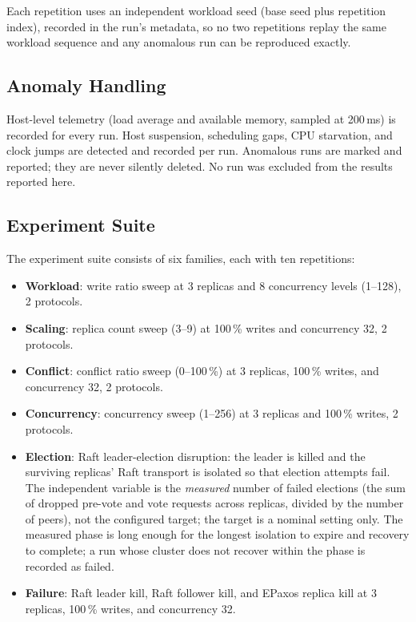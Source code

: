 Each repetition uses an independent workload seed (base seed plus repetition
index), recorded in the run's metadata, so no two repetitions replay the
same workload sequence and any anomalous run can be reproduced exactly.

\subsection{Anomaly Handling}

Host-level telemetry (load average and available memory, sampled at
200\,ms) is recorded for every run. Host suspension, scheduling gaps, CPU
starvation, and clock jumps are detected and recorded per run. Anomalous
runs are marked and reported; they are never silently deleted. No run was
excluded from the results reported here.

\subsection{Experiment Suite}

The experiment suite consists of six families, each with ten repetitions:

\begin{itemize}
\item \textbf{Workload}: write ratio sweep at 3 replicas and 8 concurrency
  levels (1--128), 2 protocols.
\item \textbf{Scaling}: replica count sweep (3--9) at 100\,\% writes and
  concurrency 32, 2 protocols.
\item \textbf{Conflict}: conflict ratio sweep (0--100\,\%) at 3 replicas,
  100\,\% writes, and concurrency 32, 2 protocols.
\item \textbf{Concurrency}: concurrency sweep (1--256) at 3 replicas and
  100\,\% writes, 2 protocols.
\item \textbf{Election}: Raft leader-election disruption: the leader is
  killed and the surviving replicas' Raft transport is isolated so that
  election attempts fail. The independent variable is the \emph{measured}
  number of failed elections (the sum of dropped pre-vote and vote requests
  across replicas, divided by the number of peers), not the configured
  target; the target is a nominal setting only. The measured phase is long
  enough for the longest isolation to expire and recovery to complete; a
  run whose cluster does not recover within the phase is recorded as
  failed.
\item \textbf{Failure}: Raft leader kill, Raft follower kill, and EPaxos
  replica kill at 3 replicas, 100\,\% writes, and concurrency 32.
\end{itemize}


